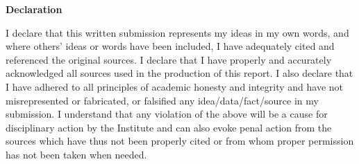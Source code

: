 \begin{Declaration}
\noindent
\begin{center}
    {\Large \textbf{Declaration}}\\
\end{center}
I declare that this written submission represents my ideas in my own words, and where others' ideas or words have been included, I have adequately cited and referenced the original sources. I declare that I have properly and accurately acknowledged all sources used in the production of this report. I also declare that I have adhered to all principles of academic honesty and integrity and have not misrepresented or fabricated, or falsified any idea/data/fact/source in my submission. I understand that any violation of the above will be a cause for disciplinary action by the Institute and can also evoke penal action from the sources which have thus not been properly cited or from whom proper permission has not been taken when needed.
\vspace{4 cm}
\DecSign[\today]
\end{Declaration}